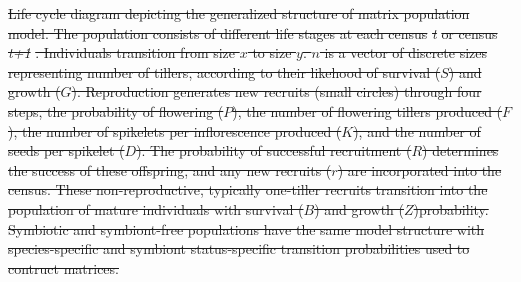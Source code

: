 \documentclass[lineno, sn-basic]{sn-jnl}%
\providecommand{\DIFdel}[1]{{\protect\color{red}\protect\scriptsize\sout{#1}}}
\providecommand{\DIFdel}[1]{{\protect\color{red}\sout{#1}}}                      %
\providecommand{\DIFdelbegin}{} %
\providecommand{\DIFdelFL}[1]{\DIFdel{#1}} %
\providecommand{\DIFaddbeginFL}{} %
\providecommand{\DIFaddendFL}{} %
\providecommand{\DIFdelbeginFL}{} %
\providecommand{\DIFdelendFL}{} %
\newcommand{\DIFscaledelfig}{0.5}
\newlength{\DIFdelgraphicswidth} %
\newlength{\DIFdelgraphicsheight} %
\newcommand{\DIFaddincludegraphics}[2][]{{\color{blue}\fbox{\DIFOincludegraphics[#1]{#2}}}} %
\newcommand{\DIFdelincludegraphics}[2][]{%
\sbox{\DIFdelgraphicsbox}{\DIFOincludegraphics[#1]{#2}}%
\settoboxwidth{\DIFdelgraphicswidth}{\DIFdelgraphicsbox} %
\settoboxtotalheight{\DIFdelgraphicsheight}{\DIFdelgraphicsbox} %
\scalebox{\DIFscaledelfig}{%
\parbox[b]{\DIFdelgraphicswidth}{\usebox{\DIFdelgraphicsbox}\\[-\baselineskip] \rule{\DIFdelgraphicswidth}{0em}}\llap{\resizebox{\DIFdelgraphicswidth}{\DIFdelgraphicsheight}{%
\setlength{\unitlength}{\DIFdelgraphicswidth}%
\begin{picture}(1,1)%
\thicklines\linethickness{2pt} %
{\color[rgb]{1,0,0}\put(0,0){\framebox(1,1){}}}%
{\color[rgb]{1,0,0}\put(0,0){\line( 1,1){1}}}%
{\color[rgb]{1,0,0}\put(0,1){\line(1,-1){1}}}%
\end{picture}%
}\hspace*{3pt}}} %
} %
\DeclareRobustCommand{\DIFdelbegin}{\DIFOdelbegin \let\includegraphics\DIFdelincludegraphics} %
\DeclareRobustCommand{\DIFaddbeginFL}{\DIFOaddbeginFL \let\includegraphics\DIFaddincludegraphics} %
\DeclareRobustCommand{\DIFaddendFL}{\DIFOaddendFL \let\includegraphics\DIFOincludegraphics} %
\DeclareRobustCommand{\DIFdelbeginFL}{\DIFOdelbeginFL \let\includegraphics\DIFdelincludegraphics} %
\DeclareRobustCommand{\DIFdelendFL}{\DIFOaddendFL \let\includegraphics\DIFOincludegraphics} %
\begin{document}
\DIFdelbegin %
\DIFdelendFL \DIFaddbeginFL \begin{myfigure}[H]
	\DIFaddendFL \centering
	\DIFdelbeginFL %
{%
\DIFdelFL{Life cycle diagram depicting the generalized structure of matrix population model. 
		The population consists of different life stages at each census }\emph{\DIFdelFL{t}} %
\DIFdelFL{or census }\emph{\DIFdelFL{t+1}}%
\DIFdelFL{. Individuals transition from size $x$ to size $y$. $n$ is a vector of discrete sizes representing number of tillers, according to their likehood of survival ($S$) and growth ($G$).  Reproduction generates new recruits (small circles) through four steps, the probability of flowering ($P$), the number of flowering tillers produced ($F$), the number of spikelets per inflorescence produced ($K$), and the number of seeds per spikelet ($D$). The probability of successful recruitment ($R$) determines the success of these offspring, and any new recruits ($r$) are incorporated into the census. These non-reproductive, typically one-tiller recruits transition into the population of mature individuals with survival ($B$) and growth ($Z$)probability. Symbiotic and symbiont-free populations have the same model structure with species-specific and symbiont status-specific transition probabilities used to contruct matrices.}}


\end{myfigure}
\end{document}
